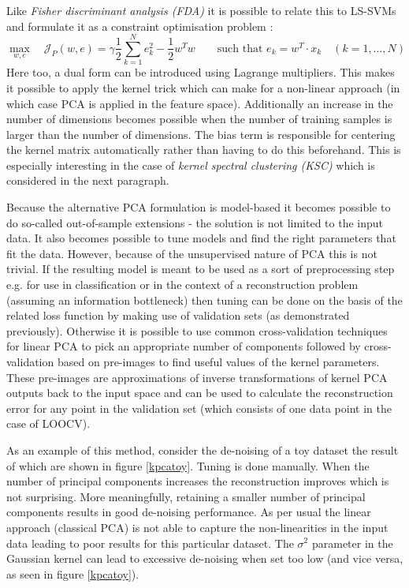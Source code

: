 \par Like \textit{Fisher discriminant analysis (FDA)} it is possible to relate this to LS-SVMs and formulate it as a constraint optimisation problem :
$$\max_{w,e}\quad\mathcal{J}_P(w,e)=\gamma\frac{1}{2}\sum_{k=1}^Ne_k^2-\frac{1}{2}w^Tw\qquad\text{such that $e_k=w^T\cdot x_k\quad(k=1,\dots, N)$}$$
Here too, a dual form can be introduced using Lagrange multipliers. This makes it possible to apply the kernel trick which can make for a non-linear approach (in which case PCA is applied in the feature space). Additionally an increase in the number of dimensions becomes possible when the number of training samples is larger than the number of dimensions. The bias term is responsible for centering the kernel matrix automatically rather than having to do this beforehand. This is especially interesting in the case of \textit{kernel spectral clustering (KSC)} which is considered in the next paragraph.

\par Because the alternative PCA formulation is model-based it becomes possible to do so-called out-of-sample extensions - the solution is not limited to the input data. It also becomes possible to tune models and find the right parameters that fit the data. However, because of the unsupervised nature of PCA this is not trivial. If the resulting model is meant to be used as a sort of preprocessing step e.g. for use in classification or in the context of a reconstruction problem (assuming an information bottleneck) then tuning can be done on the basis of the related loss function by making use of validation sets (as demonstrated previously). Otherwise it is possible to use common cross-validation techniques for linear PCA to pick an appropriate number of components followed by cross-validation based on pre-images to find useful values of the kernel parameters. These pre-images are approximations of inverse transformations of kernel PCA outputs back to the input space and can be used to calculate the reconstruction error for any point in the validation set (which consists of one data point in the case of LOOCV).

\par As an example of this method, consider the de-noising of a toy dataset the result of which are shown in figure \ref{kpcatoy}. Tuning is done manually. When the number of principal components increases the reconstruction improves which is not surprising. More meaningfully, retaining a smaller number of principal components results in good de-noising performance. As per usual the linear approach (classical PCA) is not able to capture the non-linearities in the input data leading to poor results for this particular dataset. The $\sigma^2$ parameter in the Gaussian kernel can lead to excessive de-noising when set too low (and vice versa, as seen in figure \ref{kpcatoy}).

